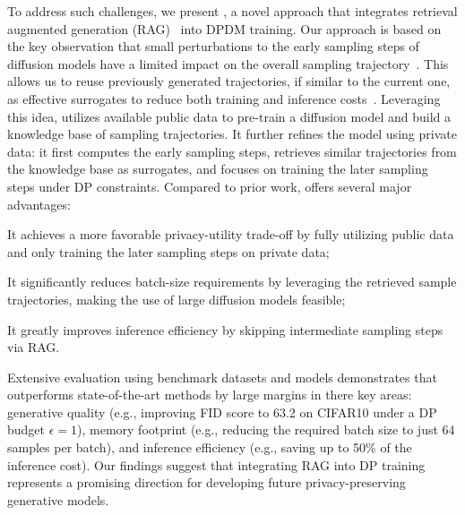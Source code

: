 To address such challenges, we present \system, a novel approach that integrates retrieval augmented generation (RAG)~\citep{lewis2020retrieval,blattmann2022retrieval} into DPDM training. Our approach is based on the key observation that small perturbations to the early sampling steps of diffusion models have a limited impact on the overall sampling trajectory~\citep{sensitivity}. This allows us to reuse previously generated trajectories, if similar to the current one, as effective surrogates to reduce both training and inference costs~\citep{zhang2023redi}. Leveraging this idea, \system utilizes available public data to pre-train a diffusion model and build a knowledge base of sampling trajectories. It further refines the model using private data: it first computes the early sampling steps, retrieves similar trajectories from the knowledge base as surrogates, and focuses on training the later sampling steps under DP constraints. Compared to prior work, \system offers several major advantages: 

\begin{mitemize}
    \item  It achieves a more favorable privacy-utility trade-off by fully utilizing public data and only training the later sampling steps on private data;
\item It significantly reduces batch-size requirements by leveraging the retrieved sample trajectories, making the use of large diffusion models feasible; 
\item It greatly improves inference efficiency by skipping intermediate sampling steps via RAG. 
\end{mitemize}

Extensive evaluation using benchmark datasets and models demonstrates that \system outperforms state-of-the-art methods by large margins in there key areas:  generative quality (e.g., improving FID score to 63.2 on CIFAR10 under a DP budget $\epsilon = 1$),  memory footprint (e.g., reducing the required batch size to just 64 samples per batch), and  inference efficiency (e.g., saving up to 50\% of the inference cost). Our findings suggest that integrating RAG into DP training represents a promising direction for developing future privacy-preserving generative models.




